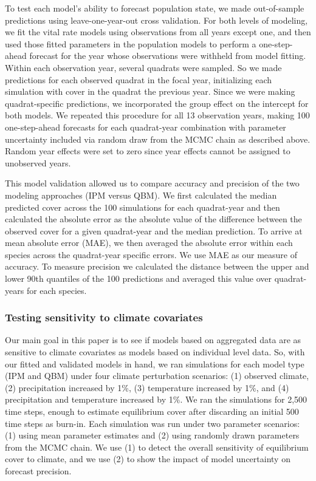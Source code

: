 \documentclass[12pt,]{article}
\begin{document}
To test each model's ability to forecast population state, we made
out-of-sample predictions using leave-one-year-out cross validation. For
both levels of modeling, we fit the vital rate models using observations
from all years except one, and then used those fitted parameters in the
population models to perform a one-step-ahead forecast for the year
whose observations were withheld from model fitting. Within each
observation year, several quadrats were sampled. So we made predictions
for each observed quadrat in the focal year, initializing each
simulation with cover in the quadrat the previous year. Since we were
making quadrat-specific predictions, we incorporated the group effect on
the intercept for both models. We repeated this procedure for all 13
observation years, making 100 one-step-ahead forecasts for each
quadrat-year combination with parameter uncertainty included via random
draw from the MCMC chain as described above. Random year effects were
set to zero since year effects cannot be assigned to unobserved years.

This model validation allowed us to compare accuracy and precision of
the two modeling approaches (IPM versus QBM). We first calculated the
median predicted cover across the 100 simulations for each quadrat-year
and then calculated the absolute error as the absolute value of the
difference between the observed cover for a given quadrat-year and the
median prediction. To arrive at mean absolute error (MAE), we then
averaged the absolute error within each species across the quadrat-year
specific errors. We use MAE as our measure of accuracy. To measure
precision we calculated the distance between the upper and lower 90th
quantiles of the 100 predictions and averaged this value over
quadrat-years for each species.

\subsubsection{Testing sensitivity to climate
covariates}\label{testing-sensitivity-to-climate-covariates}

Our main goal in this paper is to see if models based on aggregated data
are as sensitive to climate covariates as models based on individual
level data. So, with our fitted and validated models in hand, we ran
simulations for each model type (IPM and QBM) under four climate
perturbation scenarios: (1) observed climate, (2) precipitation
increased by 1\%, (3) temperature increased by 1\%, and (4)
precipitation and temperature increased by 1\%. We ran the simulations
for 2,500 time steps, enough to estimate equilibrium cover after
discarding an initial 500 time steps as burn-in. Each simulation was run
under two parameter scenarios: (1) using mean parameter estimates and
(2) using randomly drawn parameters from the MCMC chain. We use (1) to
detect the overall sensitivity of equilibrium cover to climate, and we
use (2) to show the impact of model uncertainty on forecast precision.
\end{document}
